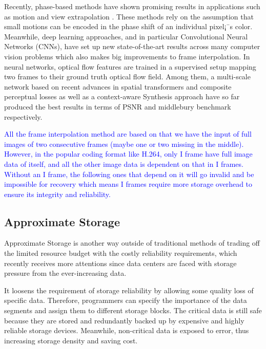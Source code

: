 \documentclass[sigconf]{acmart}
\begin{document}
Recently, phase-based methods have shown promising results in applications such as motion and view extrapolation \cite{didyk2013joint}\cite{wadhwa2013phase}\cite{meyer2015phase}. These methods rely on the assumption that small motions can be encoded in the phase shift of an individual pixel¡¯s color. Meanwhile, deep learning approaches, and in particular Convolutional Neural Networks (CNNs), have set up new state-of-the-art results across many computer vision problems which also makes big improvements to frame interpolation. In neural networks, optical flow features are trained in a supervised setup mapping two frames to their ground truth optical flow field\cite{dosovitskiy2015flownet}\cite{ilg2017flownet}. Among them, a multi-scale network\cite{van2017frame} based on recent advances in spatial transformers and composite perceptual losses as well as a context-aware Synthesis approach\cite{niklaus2018context} have so far produced the best results in terms of PSNR and middlebury benchmark respectively.

\textcolor{blue}{All the frame interpolation method are based on that we have the input of full images of two consecutive frames (maybe one or two missing in the middle). However, in the popular coding format like H.264, only I frame have full image data of itself, and all the other image data is dependent on that in I frames. Without an I frame, the following ones that depend on it will go invalid and be impossible for recovery which means I frames require more storage overhead to ensure its integrity and reliability.}


\subsection{Approximate Storage}
Approximate Storage is another way outside of traditional methods of trading off the limited resource budget with the costly reliability requirements, which recently receives more attentions since data centers are faced with storage pressure from the ever-increasing data.

It loosens the requirement of storage reliability by allowing some quality loss of specific data. Therefore, programmers can specify the importance of the data segments and assign them to different storage blocks. The critical data is still safe because they are stored and redundantly backed up by expensive and highly reliable storage devices. Meanwhile, non-critical data is exposed to error, thus increasing storage density and saving cost.
\end{document}
